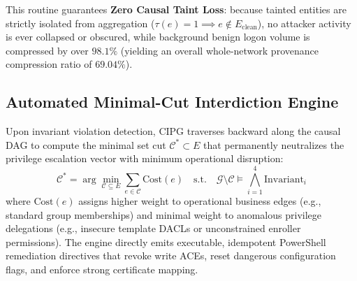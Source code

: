 This routine guarantees \textbf{Zero Causal Taint Loss}: because tainted entities are strictly isolated from aggregation ($\tau(e) = 1 \implies e \notin E_{\text{clean}}$), no attacker activity is ever collapsed or obscured, while background benign logon volume is compressed by over $98.1\%$ (yielding an overall whole-network provenance compression ratio of $69.04\%$).

\subsection{Automated Minimal-Cut Interdiction Engine}
Upon invariant violation detection, CIPG traverses backward along the causal DAG to compute the minimal set cut $\mathcal{C}^* \subset E$ that permanently neutralizes the privilege escalation vector with minimum operational disruption:
\begin{equation}
\mathcal{C}^* = \arg\min_{\mathcal{C} \subseteq E} \sum_{e \in \mathcal{C}} \text{Cost}(e) \quad \text{s.t.} \quad \mathcal{G} \setminus \mathcal{C} \models \bigwedge_{i=1}^4 \text{Invariant}_i
\end{equation}
where $\text{Cost}(e)$ assigns higher weight to operational business edges (e.g., standard group memberships) and minimal weight to anomalous privilege delegations (e.g., insecure template DACLs or unconstrained enroller permissions). The engine directly emits executable, idempotent PowerShell remediation directives that revoke write ACEs, reset dangerous configuration flags, and enforce strong certificate mapping.
